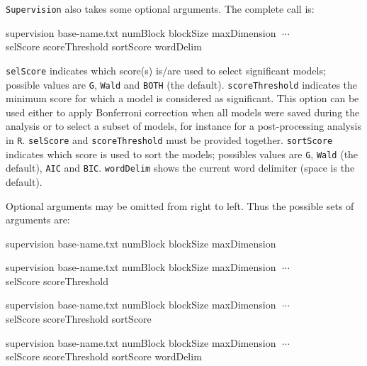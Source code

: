 \documentclass[a4paper,11pt]{article}
\newcommand{\prog}[1]{\texttt{#1}}
\newenvironment{launch}{\begin{mdframed}\ttfamily}{\end{mdframed}}
\begin{document}
\prog{Supervision} also takes some optional arguments. The complete call is:
\begin{launch}
supervision base-name.txt numBlock blockSize maxDimension $\; \cdots$\\
\indent selScore scoreThreshold sortScore wordDelim
\end{launch}
\noindent \verb+selScore+ indicates which score(s) is/are used to select significant models; possible values are \verb+G+, \verb+Wald+ and \verb+BOTH+ (the default).
\verb+scoreThreshold+ indicates the minimum score for which a model is considered as significant. 
This option can be used either to apply Bonferroni correction when all models were saved during the analysis or to select a subset of models, for instance for a post-processing analysis in \prog{R}.
\verb+selScore+ and \verb+scoreThreshold+ must be provided together.
\verb+sortScore+ indicates which score is used to sort the models; possibles values are \verb+G+, \verb+Wald+ (the default), \verb+AIC+ and \verb+BIC+.
\verb+wordDelim+ shows the current word delimiter (space is the default).

Optional arguments may be omitted from right to left. Thus the possible sets of arguments are:

\begin{launch}supervision base-name.txt numBlock blockSize maxDimension\end{launch}
\begin{launch}supervision base-name.txt numBlock blockSize maxDimension $\; \cdots$\\
\indent selScore scoreThreshold\end{launch}
\begin{launch}supervision base-name.txt numBlock blockSize maxDimension $\; \cdots$\\
\indent selScore scoreThreshold sortScore \end{launch}
\begin{launch}supervision base-name.txt numBlock blockSize maxDimension $\; \cdots$\\
\indent selScore scoreThreshold sortScore wordDelim \end{launch}
\end{document}
